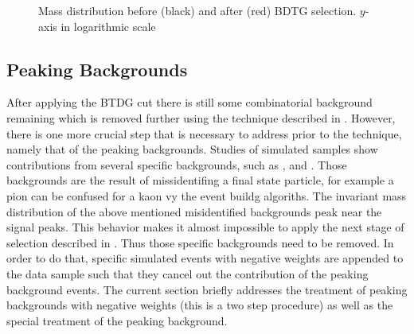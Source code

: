 \begin{figure}[h]
\begin{center}
  \scalebox{1}{}
  \caption{Mass distribution before (black) and after (red) BDTG selection. $y$-axis in logarithmic scale}
  \label{mass_BDTG_selection}
\end{center}
\end{figure}

\subsection{Peaking Backgrounds}
\label{peaking_backgrounds}

After applying the BTDG cut there is still some combinatorial background remaining which is removed
further using the \sPlot technique described in . However, there is
one more crucial step that is necessary to address prior to the \sPlot technique, namely that of the peaking backgrounds.
Studies of simulated samples show contributions from several specific backgrounds, such as \BsJpsiKK, \BsJpsipipi and \BdJpsipipi.
Those backgrounds are the result of missidentifing a final state particle, for example a pion can be confused for a kaon
vy the event buildg algoriths.  
The invariant mass distribution of the above mentioned misidentified backgrounds peak near the \BJpsiKpi signal peaks. 
This behavior makes it almost impossible to apply the next stage of selection described in .
Thus those specific backgrounds need to be removed. 
In order to do that, specific simulated events with negative weights are appended to the data sample such that they cancel out the
contribution of the peaking background events. The current section briefly addresses the treatment of peaking backgrounds 
with negative weights (this is a two step procedure) as well as the special treatment of the \LbJpsippi peaking background.

